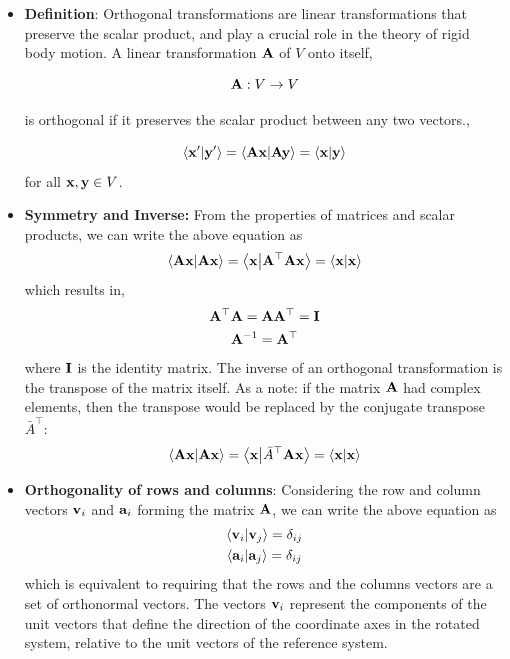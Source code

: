 \documentclass[12pt]{article}
\begin{document}
\begin{itemize}
  \item \textbf{Definition}: Orthogonal transformations are linear transformations that
        preserve the scalar product, and play a crucial role in the theory of rigid body
        motion. A linear transformation $\vb{A}$ of $V$ onto itself,

        \[
          \vb{A}: V \to V
        \]

        is orthogonal if it preserves the scalar product between any two vectors.,

        \[
          \ip{\vb{x}'}{\vb{y}'} = \ip{\vb{A}\vb{x}}{\vb{A}\vb{y}} = \ip{\vb{x}}{\vb{y}}
        \]
        for all $\vb{x}, \vb{y} \in V$.

  \item \textbf{Symmetry and Inverse:} From the properties of matrices and scalar products,
        we can write the above equation as
        \[
          \ip{\vb{A}\vb{x}}{\vb{A}\vb{x}} = \ip{\vb{x}}{\vb{A}^\top\vb{A}\vb{x}} = \ip{\vb{x}}{\vb{x}}
        \]
        which results in,
        \begin{equation}
          \begin{gathered}
            \vb{A}^\top\vb{A} = \vb{A}\vb{A}^\top = \vb{I} \\
            \vb{A}^{-1} = \vb{A}^\top
          \end{gathered}
          \label{kinematics:orthogonal-condition}
        \end{equation}
        where $\vb{I}$ is the identity matrix. The inverse of an orthogonal transformation is
        the transpose of the matrix itself. As a note: if the matrix $\vb{A}$ had complex
        elements, then the transpose would be replaced by the conjugate transpose
        $\bar{A}^\top$:
        \[
          \ip{\vb{A}\vb{x}}{\vb{A}\vb{x}} = \ip{\vb{x}}{\bar{A}^\top\vb{A}\vb{x}} = \ip{\vb{x}}{\vb{x}}
        \]

  \item \textbf{Orthogonality of rows and columns}: Considering the row and column vectors
        $\vb{v}_i$ and $\vb{a}_i$ forming the matrix $\vb{A}$, we can write the above
        equation as
        \[
          \begin{gathered}
            \ip{\vb{v}_i}{\vb{v}_j} = \delta_{ij} \\
            \ip{\vb{a}_i}{\vb{a}_j} = \delta_{ij}
          \end{gathered}
        \]
        which is equivalent to requiring that the rows and the columns vectors are a set of
        orthonormal vectors. The vectors $\vb{v}_i$ represent the components of the unit
        vectors that define the direction of the coordinate axes in the rotated system,
        relative to the unit vectors of the reference system.


\end{itemize}
\end{document}

